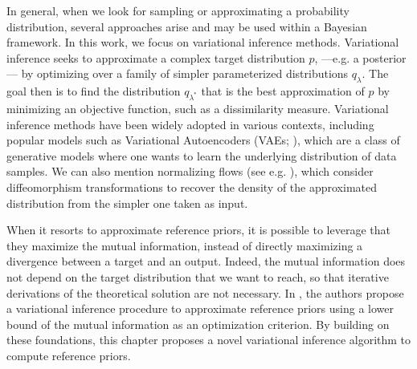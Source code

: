 In general, when we look for sampling or approximating a probability distribution,
several approaches arise and may be used within a Bayesian framework. %
In this work, we focus on variational inference methods.
Variational inference seeks to approximate a complex target distribution 
 $p$, ---e.g. a posterior--- by optimizing over a family of simpler parameterized distributions $q_{\lambda}$. The goal then is to find the distribution $q_{\lambda^\ast}$ that is the best approximation of $p$ by minimizing an objective function, such as a dissimilarity measure. %
Variational inference methods have been widely adopted in various contexts, including popular models such as Variational Autoencoders (VAEs; \cite{kingma_introduction_2019}), which are a class of generative models where one wants to learn the underlying distribution of data samples. We can also mention normalizing flows (see e.g. \cite{papamakarios_normalizing_2021,kobyzev_normalizing_2021}), 
 which consider diffeomorphism transformations to recover the density of the approximated distribution from the simpler one taken as input.


When it resorts to approximate {reference priors}, it is possible to leverage
that they maximize the mutual information, instead of directly maximizing a divergence between a target and an output. Indeed, the mutual information does not depend on the target distribution that we want to reach, so that iterative derivations of the theoretical {solution} are not necessary. In \cite{nalisnick_learning_2017}, the authors propose a variational inference procedure to approximate reference priors using a lower bound of the mutual information as an optimization criterion. %
%
By building on these foundations, this chapter proposes a novel variational inference algorithm to compute reference priors.  %



